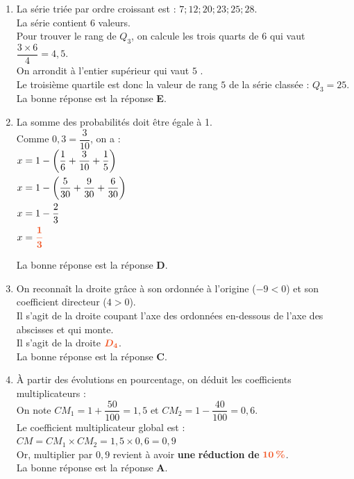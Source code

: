 \documentclass[a4paper,11pt]{article}
\newcounter{seancenum}
\begin{document}
\setcounter{seancenum}{28}
\newpage
\begin{seance}{} %

\begin{enumerate}
\item La série triée par ordre croissant est : $7  ;  12  ;  20  ;  23  ;  25  ;  28$.\\La série contient $6$ valeurs.\\
      Pour trouver le rang de $Q_3$, on calcule les trois quarts de $6$ qui vaut
       $\dfrac{3\times6}{4}=4{,}5$.\\On arrondit à l'entier supérieur qui vaut $5$ .\\ Le troisième quartile est donc la valeur de rang $5$ de la série classée : $Q_3=25$.\\La bonne réponse est la réponse {\bfseries \color[HTML]{F15929}E}.

\item La somme des probabilités doit être égale à 1.  \\Comme $0{,}3=\dfrac{3}{10}$, on a : \\
        $\begin{aligned}
        x&=1-\left(\dfrac{1}{6}+\dfrac{3}{10}+\dfrac{1}{5}\right)\\
        x&=1-\left(\dfrac{5}{30}+\dfrac{9}{30}+\dfrac{6}{30}\right)\\
        x&=1-\dfrac{2}{3}\\
        x&={\color[HTML]{F15929}\boldsymbol{\dfrac{1}{3}}}
        \end{aligned}$ 

\medskip
La bonne réponse est la réponse {\bfseries \color[HTML]{F15929}D}.

\item On reconnaît la droite grâce à son ordonnée à l'origine ($-9<0$) et son coefficient directeur ($4>0$).\\
    Il s'agit de la droite coupant l'axe des ordonnées en-dessous de l'axe des abscisses et qui monte.\\
    Il s'agit de la droite ${\color[HTML]{F15929}\boldsymbol{D_4}}$.\\La bonne réponse est la réponse {\bfseries \color[HTML]{F15929}C}.

\item À partir des évolutions en pourcentage, on déduit les coefficients multiplicateurs : \\On note $CM_1 = 1 + \dfrac{50}{100}=1{,}5$ et  $CM_2 = 1 - \dfrac{40}{100}=0{,}6$.\\ Le coefficient multiplicateur global est : \\ $CM = CM_1 \times CM_2 = 1{,}5 \times 0{,}6 = 0{,}9$ \\Or, multiplier par $0{,}9$ revient à avoir {\bfseries \color[HTML]{F15929}une} {\bfseries \color[HTML]{F15929}réduction} {\bfseries \color[HTML]{F15929}de} ${\color[HTML]{F15929}\boldsymbol{10\,\%}}$.\\La bonne réponse est la réponse {\bfseries \color[HTML]{F15929}A}.


\end{enumerate}
\end{seance}
\end{document}
